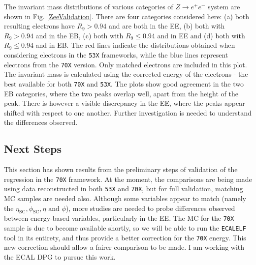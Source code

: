 \documentclass[10pt]{article}
\begin{document}
The invariant mass distributions of various categories of $Z \rightarrow e^+e^-$ system are shown in Fig. \ref{ZeeValidation}. There are four categories considered here: (a) both resulting electrons have $R_9 >0.94$ and are both in the EE, (b) both with $R_9>0.94$ and in the EB, (c) both with $R_9 \leq 0.94$ and in EE and (d) both with $R_9 \leq 0.94$ and in EB. The red lines indicate the distributions obtained when considering electrons in the \texttt{53X} frameworks, while the blue lines represent electrons from the \texttt{70X} version. Only matched electrons are included in this plot. The invariant mass is calculated using the corrected energy of the electrons - the best available for both \texttt{70X} and \texttt{53X}. The plots show good agreement in the two EB categories, where the two peaks overlap well, apart from the height of the peak. There is however a visible discrepancy in the EE, where the peaks appear shifted with respect to one another. Further investigation is needed to understand the differences observed.


%


\subsection{Next Steps}

This section has shown results from the preliminary steps of validation of the regression in the \texttt{70X} framework. At the moment, the comparisons are being made using data reconstructed in both \texttt{53X} and \texttt{70X}, but for full validation, matching MC samples are needed also. Although some variables appear to match (namely the $\eta_{\text{SC}},\phi_{\text{SC}},\eta \text{ and }\phi$), more studies are needed to probe differences observed between energy-based variables, particularly in the EE. The MC for the \texttt{70X} sample is due to become available shortly, so we will be able to run the \texttt{ECALELF} tool in its entirety, and thus provide a better correction for the \texttt{70X} energy. This new correction should allow a fairer comparison to be made. I am working with the ECAL DPG to pursue this work.
\end{document}
